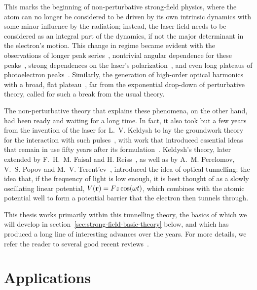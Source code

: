 This marks the beginning of non-perturbative strong-field physics, where the atom can no longer be considered to be driven by its own intrinsic dynamics with some minor influence by the radiation; instead, the laser field needs to be considered as an integral part of the dynamics, if not the major determinant in the electron's motion. This change in regime became evident with the observations of longer peak series~\cite{ schafer_ati-beyond-the-hhg-cutoff_1993}, nontrivial angular dependence for these peaks~\cite{baorui_ati-rings_1993}, strong dependences on the laser's polarization~\cite{corkum_long-wavelength-ati_1989}, and even long plateaus of photoelectron peaks~\cite{paulus_ati-plateau_1994}. Similarly, the generation of high-order optical harmonics with a broad, flat plateau~\cite{mcpherson_hhg-initial_1987, ferray_hhg_1988}, far from the exponential drop-down of perturbative theory, called for such a break from the usual theory.


The non-perturbative theory that explains these phenomena, on the other hand, had been ready and waiting for a long time. In fact, it also took but a few years from the invention of the laser for L.~V. Keldysh to lay the groundwork theory for the interaction with such pulses~\cite{keldysh_ionization_1965}, with work that introduced essential ideas that remain in use fifty years after its formulation~\cite{ dimauro_keldysh-plus-50_2014}. Keldysh's theory, later extended by F.~H.~M. Faisal and H. Reiss~\cite{faisal_multiple_1973, reiss_effect_1980}, as well as by  A.~M. Perelomov, V.~S. Popov and M.~V. Terent'ev~\cite{perelomov_ionization_1966, perelomov_ionization-II_1967, perelomov_ionization-III_1967}, introduced the idea of optical tunnelling: the idea that, if the frequency of light is low enough, it is best thought of as a slowly oscillating linear potential, $V(\vb{r}) = Fz\cos(\omega t)$, which combines with the atomic potential well to form a potential barrier that the electron then tunnels through.

This thesis works primarily within this tunnelling theory, the basics of which we will develop in section~\ref{sec:strong-field-basic-theory} below, and which has produced a long line of interesting advances over the years. For more details, we refer the reader to several good recent reviews~\cite{ popruzhenko_Keldysh_theory, long_Keldysh_theory, Popov_imaginary_time}.




\section{Applications}

